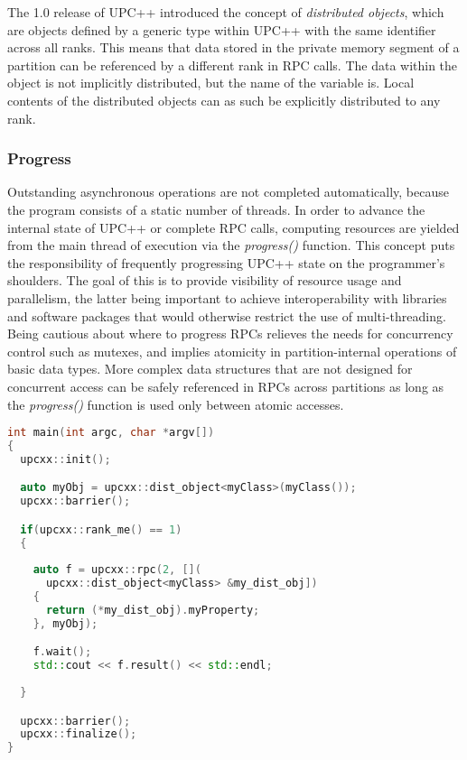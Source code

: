 \documentclass{uit-report}
\begin{document}
The 1.0 release of UPC++ introduced the concept of \emph{distributed objects}, which are objects defined by a generic type within UPC++ with the same identifier across all ranks. This means that data stored in the private memory segment of a partition can be referenced by a different rank in RPC calls. The data within the object is not implicitly distributed, but the name of the variable is. Local contents of the distributed objects can as such be explicitly distributed to any rank.

\subsubsection{Progress}
Outstanding asynchronous operations are not completed automatically, because the program consists of a static number of threads. In order to advance the internal state of UPC++ or complete RPC calls, computing resources are yielded from the main thread of execution via the \emph{progress()} function. This concept puts the responsibility of frequently progressing UPC++ state on the programmer's shoulders. The goal of this is to provide visibility of resource usage and parallelism, the latter being important to achieve interoperability with libraries and software packages that would otherwise restrict the use of multi-threading. Being cautious about where to progress RPCs relieves the needs for concurrency control such as mutexes, and implies atomicity in partition-internal operations of basic data types. More complex data structures that are not designed for concurrent access can be safely referenced in RPCs across partitions as long as the \emph{progress()} function is used only between atomic accesses.

\begin{lstlisting}[label={lst:distribobj}, float=t,frame=tlrb, caption={Communication through RPC, referencing a distributed object of an arbitrary C++ class. Rank 1 retrieves and prints \emph{myProperty} from rank 2's instance of \emph{myObj}.}, captionpos=b, language=c++, showstringspaces=false]
int main(int argc, char *argv[])
{
  upcxx::init();

  auto myObj = upcxx::dist_object<myClass>(myClass());
  upcxx::barrier();

  if(upcxx::rank_me() == 1)
  {
  
    auto f = upcxx::rpc(2, [](
      upcxx::dist_object<myClass> &my_dist_obj])
    {
      return (*my_dist_obj).myProperty;
    }, myObj);

    f.wait();
    std::cout << f.result() << std::endl;
    
  }

  upcxx::barrier();
  upcxx::finalize();
} 
\end{lstlisting}
\end{document}
